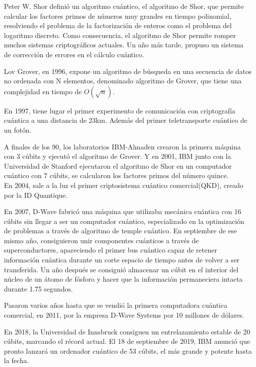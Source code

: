 Peter W. Shor definió un algoritmo cuántico, el algoritmo de Shor, que permite calcular los factores primos de números muy grandes en tiempo polinomial, resolviendo el problema de la factorización de enteros como el problema del logaritmo discreto. Como consecuencia, el algoritmo de Shor permite romper muchos sistemas criptográficos actuales. Un año más tarde, propuso un sistema de corrección de errores en el cálculo cuántico.

Lov Grover, en 1996, expone un algoritmo de búsqueda en una secuencia de datos no ordenada con N elementos, denominado algoritmo de Grover, que tiene una complejidad en tiempo de $O(\sqrt{n})$.

En 1997, tiene lugar el primer experimento de comunicación con criptografía cuántica a una distancia de 23km. Además del primer teletransporte cuántico de un fotón.

A finales de los 90, los laboratorios IBM-Almaden crearon la primera máquina con 3 cúbits y ejecutó el algoritmo de Grover. Y en 2001, IBM junto con la Universidad de Stanford ejecutaron el algoritmo de Shor en un computador cuántico con 7 cúbits, se calcularon los factores primos del número quince.\\

En 2004, sale a la luz el primer criptosistema cuántico comercial(QKD), creado por la ID Quantique.

En 2007, D-Wave fabricó una máquina que utilizaba mecánica cuántica con 16 cúbits sin llegar a ser un computador cuántico, especializado en la optimización de problemas a través de algoritmo de temple cuántico. En septiembre de ese mismo año, consiguieron unir componentes cuánticos a través de superconductores, apareciendo el primer bus cuántico capaz de retener información cuántica durante un corte espacio de tiempo antes de volver a ser transferida. Un año después se consiguió almacenar un cúbit en el interior del núcleo de un átomo de fósforo y hacer que la información permaneciera intacta durante 1.75 segundos.

Pasaron varios años hasta que se vendió la primera computadora cuántica comercial, en 2011, por la empresa D-Wave Systems por 10 millones de dólares.

En 2018, la Universidad de Innsbruck consiguen un entrelazamiento estable de 20 cúbits, marcando el récord actual. El 18 de septiembre de 2019, IBM anunció que pronto lanzará un ordenador cuántico de 53 cúbits, el más grande y potente hasta la fecha.\\

